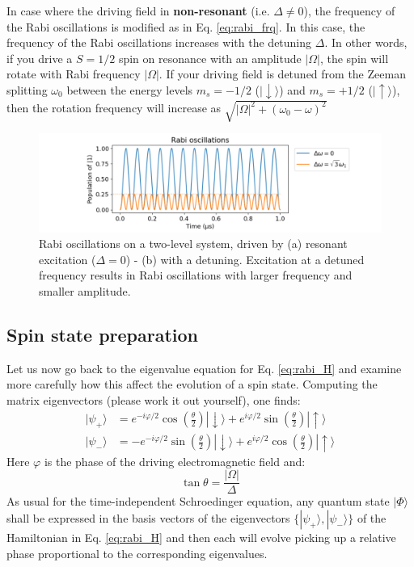 \documentclass[a4paper,11pt]{article}
\newcommand{\ket}[1]{| #1 \rangle}
\begin{document}
In case where the driving field in {\bf non-resonant} (i.e. $\Delta \neq 0$), the frequency of the Rabi oscillations is modified as in Eq. \ref{eq:rabi_frq}. In this case, the frequency of the Rabi oscillations increases with the detuning $\Delta$. In other words, if you drive a $S=1/2$ spin on resonance with an amplitude $|\Omega|$, the spin will rotate with Rabi frequency $|\Omega|$.
If your driving field is detuned from the Zeeman splitting $\omega_0$ between the energy levels $m_s = -1/2$  ($\ket{\downarrow}$) and $m_s = +1/2$ ($\ket{\uparrow}$), then the rotation frequency will increase as $\sqrt{|\Omega|^2+(\omega_0 - \omega)^2}$ 

\begin{figure}[h]
    \centering
    \includegraphics[width =1\textwidth]{figures/rabi.png}
    \caption{Rabi oscillations on a two-level system, driven by (a) resonant excitation ($\Delta = 0$) - (b) with a detuning. Excitation at a detuned frequency results in Rabi oscillations with larger frequency and smaller amplitude.}
    \label{fig:rabi}
\end{figure}


\subsection{Spin state preparation}
Let us now go back to the eigenvalue equation for Eq. \ref{eq:rabi_H} and examine more carefully how this affect the evolution of a spin state. Computing the matrix eigenvectors (please work it out yourself), one finds:
\begin{subequations}
\begin{align}
\ket{\psi_+}&=e^{-i\varphi/2} \cos{\left( \frac{\theta}{2}\right)} \ket{\downarrow} + e^{i\varphi/2} \sin{\left(\frac{\theta}{2}\right)} \ket{\uparrow}\\
\ket{\psi_-}&=-e^{-i\varphi/2} \sin{\left( \frac{\theta}{2}\right)} \ket{\downarrow} + e^{i\varphi/2} \cos{\left(\frac{\theta}{2}\right)} \ket{\uparrow}
\end{align}
\end{subequations}
Here $\varphi$ is the phase of the driving electromagnetic field and:
\begin{equation}
    \tan{\theta} = \frac{|\Omega|}{\Delta}
\end{equation}
As usual for the time-independent Schroedinger equation, any quantum state $\ket{\Phi}$ shall be expressed in the basis vectors of the eigenvectors $\lbrace \ket{\psi_+}, \ket{\psi_-} \rbrace$ of the Hamiltonian in Eq. \ref{eq:rabi_H} and then each will evolve picking up a relative phase proportional to the corresponding eigenvalues.
\end{document}
